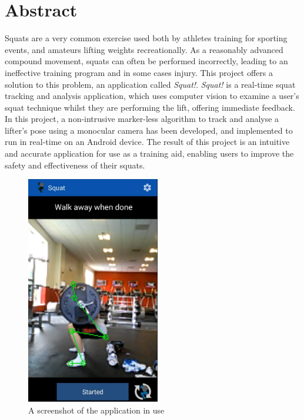 \section*{Abstract}

Squats are a very common exercise used both by athletes training for sporting events, and amateurs lifting weights recreationally. As a reasonably advanced compound movement, squats can often be performed incorrectly, leading to an ineffective training program and in some cases injury. This project offers a solution to this problem, an application called \emph{Squat!}. \emph{Squat!} is a real-time squat tracking and analysis application, which uses computer vision to examine a user's squat technique whilst they are performing the lift, offering immediate feedback. In this project, a non-intrusive marker-less algorithm to track and analyse a lifter's pose using a monocular camera has been developed, and implemented to run in real-time on an Android device. The result of this project is an intuitive and accurate application for use as a training aid, enabling users to improve the safety and effectiveness of their squats.

\begin{figure}[H]
    \centering
	\includegraphics[height=10cm]{application/images/belowparallel}
\caption{A screenshot of the application in use}
\label{fig:preview}
\end{figure}